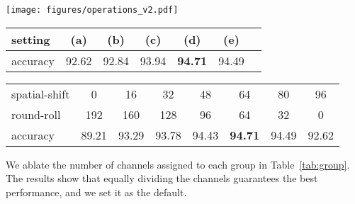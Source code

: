 \documentclass[11pt]{article}
\begin{document}
\begin{figure*}[t!]
\centering
\texttt{[image: figures/operations\_v2.pdf]}

\begin{tabular}{lcccccc}
\toprule
setting & (a) & (b) & (c) & (d) & (e) \\
\midrule
accuracy  & 92.62 & 92.84 & 93.94 & \textbf{94.71} & 94.49 \\
\bottomrule
\end{tabular}

\vspace{0.1in}

\caption{The different settings to ablate the round-roll module. (a) spatial-shift only and no interrelation between views; (b) shift 1 stride both forward and backward; (c) roll 1 stride forward; (d) roll 1 stride both forward and backward; (e) roll 2 strides both forward and backward. We observe that the best performance is (d) when rolling feature tensor along view dimension 1 stride forward and backward.} \label{tab:roll}\vspace{0.1in}
\end{figure*}

\begin{table*}[h]

\vspace{0.2in}

\caption{
Ablation on R-MLP block's group splitting. We assign four groups for spatial-shift and two groups for round-roll.
The channel  is 384 in total.
The first row is for each spatial-shift group, and the second is for each round-roll group. Equally divided is the best.
}
\label{tab:group}
\centering
\begin{tabular}{lccccccc}
\toprule
 spatial-shift & 0 & 16 & 32 & 48 & 64 & 80 & 96 \\
 round-roll & 192 & 160 & 128 & 96 & 64 & 32 & 0 \\
 \midrule
 accuracy & 89.21 & 93.29 & 93.78 & 94.43 & \textbf{94.71} & 94.49 & 92.62 \\
\bottomrule
\end{tabular}\vspace{0.2in}
\end{table*}

We ablate the number of channels assigned to each group in Table~\ref{tab:group}. The results show that equally dividing the channels guarantees the best performance, and we set it as the default.

\newpage
\end{document}
